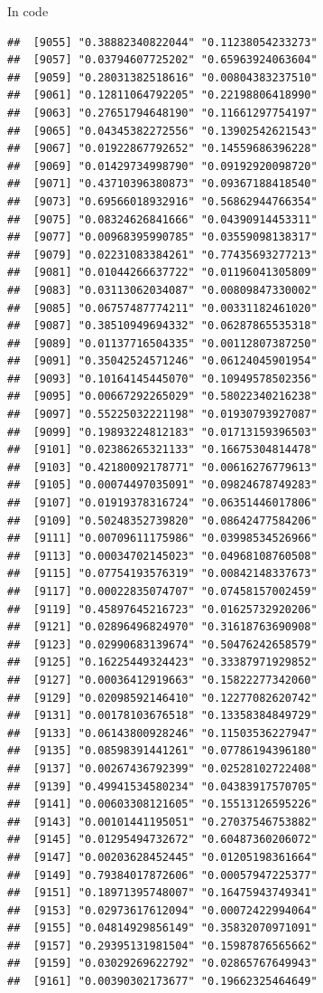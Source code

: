 \documentclass[ignorenonframetext,]{beamer}
\begin{document}
\begin{frame}[fragile]{In code}
\begin{verbatim}
##  [9055] "0.38882340822044" "0.11238054233273"
##  [9057] "0.03794607725202" "0.65963924063604"
##  [9059] "0.28031382518616" "0.00804383237510"
##  [9061] "0.12811064792205" "0.22198806418990"
##  [9063] "0.27651794648190" "0.11661297754197"
##  [9065] "0.04345382272556" "0.13902542621543"
##  [9067] "0.01922867792652" "0.14559686396228"
##  [9069] "0.01429734998790" "0.09192920098720"
##  [9071] "0.43710396380873" "0.09367188418540"
##  [9073] "0.69566018932916" "0.56862944766354"
##  [9075] "0.08324626841666" "0.04390914453311"
##  [9077] "0.00968395990785" "0.03559098138317"
##  [9079] "0.02231083384261" "0.77435693277213"
##  [9081] "0.01044266637722" "0.01196041305809"
##  [9083] "0.03113062034087" "0.00809847330002"
##  [9085] "0.06757487774211" "0.00331182461020"
##  [9087] "0.38510949694332" "0.06287865535318"
##  [9089] "0.01137716504335" "0.00112807387250"
##  [9091] "0.35042524571246" "0.06124045901954"
##  [9093] "0.10164145445070" "0.10949578502356"
##  [9095] "0.00667292265029" "0.58022340216238"
##  [9097] "0.55225032221198" "0.01930793927087"
##  [9099] "0.19893224812183" "0.01713159396503"
##  [9101] "0.02386265321133" "0.16675304814478"
##  [9103] "0.42180092178771" "0.00616276779613"
##  [9105] "0.00074497035091" "0.09824678749283"
##  [9107] "0.01919378316724" "0.06351446017806"
##  [9109] "0.50248352739820" "0.08642477584206"
##  [9111] "0.00709611175986" "0.03998534526966"
##  [9113] "0.00034702145023" "0.04968108760508"
##  [9115] "0.07754193576319" "0.00842148337673"
##  [9117] "0.00022835074707" "0.07458157002459"
##  [9119] "0.45897645216723" "0.01625732920206"
##  [9121] "0.02896496824970" "0.31618763690908"
##  [9123] "0.02990683139674" "0.50476242658579"
##  [9125] "0.16225449324423" "0.33387971929852"
##  [9127] "0.00036412919663" "0.15822277342060"
##  [9129] "0.02098592146410" "0.12277082620742"
##  [9131] "0.00178103676518" "0.13358384849729"
##  [9133] "0.06143800928246" "0.11503536227947"
##  [9135] "0.08598391441261" "0.07786194396180"
##  [9137] "0.00267436792399" "0.02528102722408"
##  [9139] "0.49941534580234" "0.04383917570705"
##  [9141] "0.00603308121605" "0.15513126595226"
##  [9143] "0.00101441195051" "0.27037546753882"
##  [9145] "0.01295494732672" "0.60487360206072"
##  [9147] "0.00203628452445" "0.01205198361664"
##  [9149] "0.79384017872606" "0.00057947225377"
##  [9151] "0.18971395748007" "0.16475943749341"
##  [9153] "0.02973617612094" "0.00072422994064"
##  [9155] "0.04814929856149" "0.35832070971091"
##  [9157] "0.29395131981504" "0.15987876565662"
##  [9159] "0.03029269622792" "0.02865767649943"
##  [9161] "0.00390302173677" "0.19662325464649"

\end{verbatim}
\end{frame}
\end{document}
